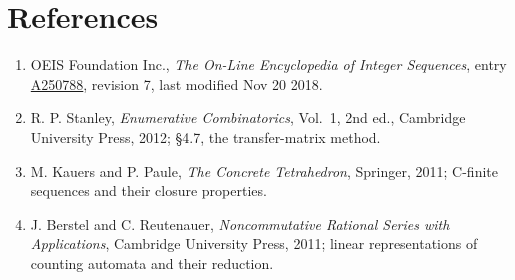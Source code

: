 \documentclass[11pt]{article}
\theoremstyle{definition}
\begin{document}
\section{References}

\begin{enumerate}

\item OEIS Foundation Inc., \emph{The On-Line Encyclopedia of Integer Sequences}, entry \href{https://oeis.org/A250788}{A250788}, revision 7, last modified Nov 20 2018.

\item R. P. Stanley, \emph{Enumerative Combinatorics}, Vol.~1, 2nd ed., Cambridge University Press, 2012; \S4.7, the transfer-matrix method.

\item M. Kauers and P. Paule, \emph{The Concrete Tetrahedron}, Springer, 2011; C-finite sequences and their closure properties.

\item J. Berstel and C. Reutenauer, \emph{Noncommutative Rational Series with Applications}, Cambridge University Press, 2011; linear representations of counting automata and their reduction.

\end{enumerate}
\end{document}
